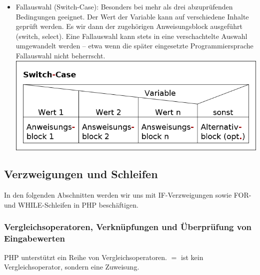 \begin{itemize}
	\item Fallauswahl (Switch-Case): Besonders bei mehr als drei abzuprüfenden Bedingungen geeignet. Der Wert der Variable kann auf verschiedene Inhalte geprüft werden. Es wir dann der zugehörigen Anweisungsblock ausgeführt (switch, select). Eine Fallauswahl kann stets in eine verschachtelte Auswahl umgewandelt werden -- etwa wenn die später eingesetzte Programmiersprache Fallauswahl nicht beherrscht.\\
\includegraphics[scale=0.5]{1jahr_pictures/lf06prog-pic/lf06prog-switch-case-struct.png}
\end{itemize}



\subsection{Verzweigungen und Schleifen}

In den folgenden Abschnitten werden wir uns mit IF-Verzweigungen sowie FOR- und WHILE-Schleifen in PHP beschäftigen. 

\subsubsection{Vergleichsoperatoren, Verknüpfungen und Überprüfung von Eingabewerten}

PHP unterstützt ein Reihe von Vergleichsoperatoren. $=$ ist kein Vergleichsoperator, sondern eine Zuweisung.

